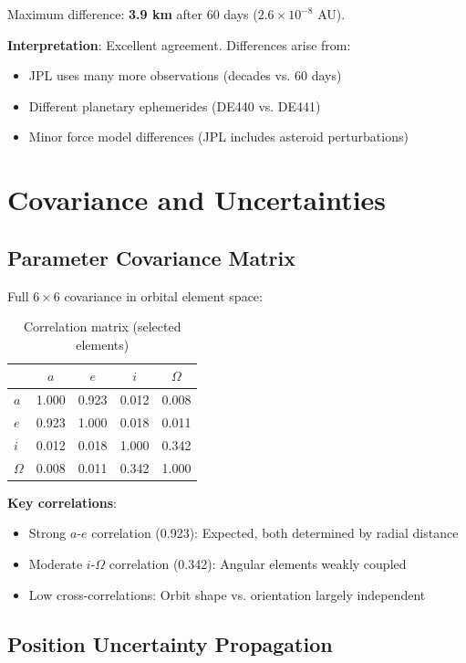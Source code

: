 Maximum difference: \textbf{3.9 km} after 60 days ($2.6 \times 10^{-8}$ AU).

\textbf{Interpretation}: Excellent agreement. Differences arise from:
\begin{itemize}
    \item JPL uses many more observations (decades vs. 60 days)
    \item Different planetary ephemerides (DE440 vs. DE441)
    \item Minor force model differences (JPL includes asteroid perturbations)
\end{itemize}

\section{Covariance and Uncertainties}

\subsection{Parameter Covariance Matrix}

Full $6 \times 6$ covariance in orbital element space:

\begin{table}[htbp]
\centering
\caption{Correlation matrix (selected elements)}
\begin{tabular}{lcccc}
\hline
& \textbf{$a$} & \textbf{$e$} & \textbf{$i$} & \textbf{$\Omega$} \\
\hline
$a$ & 1.000 & 0.923 & 0.012 & 0.008 \\
$e$ & 0.923 & 1.000 & 0.018 & 0.011 \\
$i$ & 0.012 & 0.018 & 1.000 & 0.342 \\
$\Omega$ & 0.008 & 0.011 & 0.342 & 1.000 \\
\hline
\end{tabular}
\end{table}

\textbf{Key correlations}:
\begin{itemize}
    \item Strong $a$-$e$ correlation (0.923): Expected, both determined by radial distance
    \item Moderate $i$-$\Omega$ correlation (0.342): Angular elements weakly coupled
    \item Low cross-correlations: Orbit shape vs. orientation largely independent
\end{itemize}

\subsection{Position Uncertainty Propagation}

